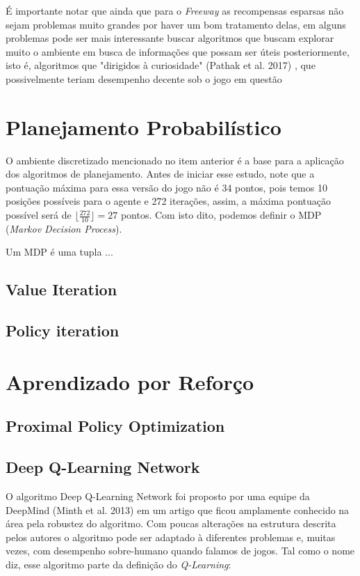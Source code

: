 \documentclass[letterpaper]{article} %
\begin{document}
É importante notar que ainda que para o \textit{Freeway} as recompensas esparsas não sejam problemas muito grandes por haver um bom tratamento delas, em alguns problemas pode ser mais interessante buscar algoritmos que buscam explorar muito o ambiente em busca de informações que possam ser úteis posteriormente, isto é, algoritmos que "dirigidos à curiosidade" (Pathak et al. 2017) , que possivelmente teriam desempenho decente sob o jogo em questão 


\section{Planejamento Probabilístico}
O ambiente discretizado mencionado no item anterior é a base para a aplicação dos algoritmos de planejamento. Antes de iniciar esse estudo, note que a pontuação máxima para essa versão do jogo não é 34 pontos, pois temos 10 posições possíveis para o agente e 272 iterações, assim, a máxima pontuação possível será de $\lfloor \frac{272}{10}\rfloor = 27$ pontos. Com isto dito, podemos definir o MDP (\textit{Markov Decision Process}).

Um MDP é uma tupla ...


\subsection{Value Iteration}

\subsection{Policy iteration}

\section{Aprendizado por Reforço}

\subsection{Proximal Policy Optimization}

\subsection{Deep Q-Learning Network}
O algoritmo Deep Q-Learning Network foi proposto por uma equipe da DeepMind (Minth et al. 2013) em um artigo que ficou amplamente conhecido na área pela robustez do algoritmo. Com poucas alterações na estrutura descrita pelos autores o algoritmo pode ser adaptado à diferentes problemas e, muitas vezes, com desempenho sobre-humano quando falamos de jogos. Tal como o nome diz, esse algoritmo parte da definição do \textit{Q-Learning}:
\end{document}
